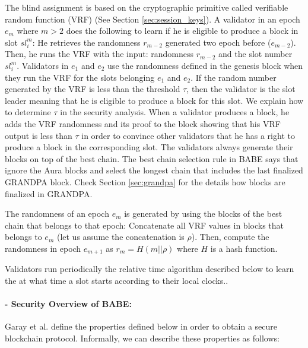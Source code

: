 The blind assignment is based on the cryptographic primitive called verifiable random function (VRF) \cite{vrf} (See Section \ref{sec:session_keys}). 
A validator in an epoch $e_m$ where $m > 2$ does the following to learn if he is eligible to produce a block in slot $sl_i^m$: He retrieves the randomness $r_{m-2}$ generated two epoch before ($e_{m-2}$). Then, he runs the VRF with the input:  randomness $r_{m-2}$ and the slot number $ sl_i^m $.  Validators in $e_1$ and $e_2$ use the randomness defined in the genesis block when they run the VRF for the slots belonging $e_1$ and $e_2$. If the random number generated by the VRF is less than the threshold $ \tau $, then the validator is the slot leader meaning that he is eligible to produce a block for this slot. We explain how to determine $\tau$ in the security analysis. 
When a validator produces a block, he adds the VRF randomness and its proof to the block showing that his VRF output is less than $\tau$  in order to convince other validators that he has a right to produce a block in the corresponding slot. The validators always generate their blocks on top of the best chain.
The best chain selection rule in BABE says that ignore the Aura blocks and select the longest chain that includes the last finalized GRANDPA block. Check Section \ref{sec:grandpa} for the details how blocks are finalized in GRANDPA. 

The randomness of an epoch $e_m$ is generated by using the blocks of the best chain that belongs to that epoch: Concatenate all  VRF values in blocks that belongs to $e_m$  (let us assume  the concatenation is \(\rho\)). Then, compute the randomness in epoch $e_{m+1}$ as $r_{m} = H(m
||\rho)$ where $ H $ is a hash function. 

Validators run periodically the relative time algorithm described below to learn the at what time a slot starts according to their local clocks..




\paragraph{- Security Overview of BABE:} Garay et al. \cite{backbone} define the properties defined below in order to obtain a secure blockchain protocol. Informally, we can describe these properties as follows:

